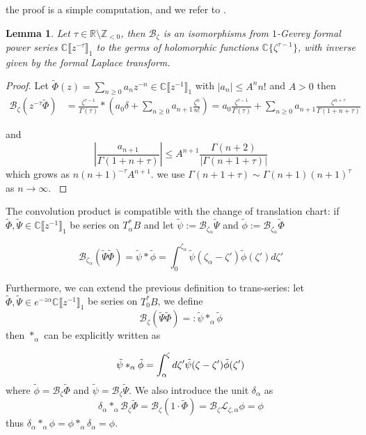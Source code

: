 \documentclass{article}
\theoremstyle{definition}
\newcommand{\Z}{\mathbb{Z}}
\newcommand{\C}{\mathbb{C}}
\newcommand{\series}[1]{\tilde{#1}}
\newcommand{\laplace}{\mathcal{L}}
\newcommand{\borel}{\mathcal{B}}
\theoremstyle{plain}
\newtheorem{lemma}[definition]{Lemma}
\newenvironment{verify}{\color{ForestGreen}}{\color{black}}
\begin{document}
the proof is a simple computation, and we refer to  \cite[Definition 5.12 and Lemma 5.14]{diverg-resurg-i}.
\begin{lemma}
    Let $\tau\in\mathbb{R}\setminus\Z_{<0}$, then $\borel_\zeta$ is an isomorphisms from $1$-Gevrey formal power series $\C \llbracket z^{-\tau} \rrbracket_1$ to the germs of holomorphic functions $\C \lbrace \zeta^{\tau-1} \rbrace$, with inverse given by the formal Laplace transform.
\end{lemma}
\begin{proof}
    Let $\tilde{\Phi}(z)=\sum_{n\geq 0}a_nz^{-n}\in\C \llbracket z^{-1} \rrbracket_1$ with $|a_n|\leq A^n n!$ and $A>0$ then  
\begin{align*}
\borel_\zeta (z^{-\tau}\tilde{\Phi})&=\frac{\zeta^{\tau-1}}{\Gamma(\tau)}\ast\left(a_0\delta+\sum_{n\geq 0}a_{n+1}\frac{\zeta^n}{n!}\right)=a_0\frac{\zeta^{\tau-1}}{\Gamma(\tau)}+\sum_{n\geq 0}a_{n+1}\frac{\zeta^{n+\tau}}{\Gamma(1+n+\tau)}
\end{align*}  

and \[\left|\frac{a_{n+1}}{\Gamma(1+n+\tau)}\right|\leq A^{n+1}\frac{\Gamma(n+2)}{|\Gamma(n+1+\tau)|} \]
which grows as $n(n+1)^{-\tau} A^{n+1}$.
\begin{verify}
    we use $\Gamma(n+1+\tau)\sim \Gamma(n+1) (n+1)^\tau$ as $n\to\infty$. 
\end{verify}
\end{proof}


The convolution product is compatible with the change of translation chart: if $\tilde{\Phi}, \tilde{\Psi}\in \C \llbracket z^{-1} \rrbracket_1$ be series on $T^*_\alpha B$ and let $\series{\psi}:=\borel_{\zeta_\alpha}\series{\Psi}$ and $\series{\phi}:=\borel_{\zeta_\alpha}\series{\Phi}$

\[\borel_{\zeta_\alpha}(\series{\Psi}\series{\Phi})=\series{\psi}\ast \series{\phi}=\int_{0}^{\zeta_\alpha}\series{\psi}(\zeta_\alpha-\zeta')\series{\phi}(\zeta')d\zeta'\]

Furthermore, we can extend the previous definition to trans-series: let $\tilde{\Phi}, \tilde{\Psi}\in e^{-z\alpha}\C \llbracket z^{-1} \rrbracket_1$ be series on $T^*_0 B$, we define  \[\borel_{\zeta}(\series{\Psi}\series{\Phi})=:\series{\psi}\ast_\alpha\series{\phi}\]
then $\ast_\alpha$ can be explicitly written as 

\begin{equation}
    \tilde{\psi}\ast_\alpha\Tilde{\phi}=\int_\alpha^{\zeta}d\zeta' \tilde{\psi}(\zeta-\zeta')\tilde{\phi}(\zeta')
\end{equation}
where $\series{\phi}=\borel_\zeta\series{\Phi}$ and $\series{\psi}=\borel_\zeta\series{\Psi}$. We also introduce the unit $\delta_\alpha$ as \[\delta_\alpha\ast_\alpha\borel_\zeta\series{\Phi}=\borel_\zeta(1\cdot\series{\Phi})=\borel_\zeta\laplace_{\zeta,\alpha}\phi=\phi\]
thus $\delta_\alpha\ast_\alpha\phi=\phi\ast_\alpha\delta_\alpha=\phi$. 
\end{document}
